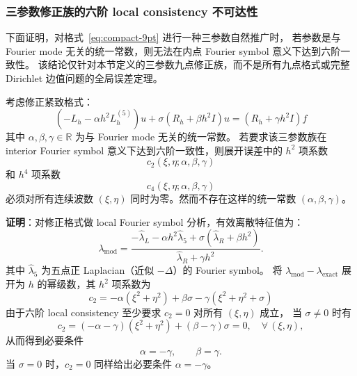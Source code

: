 \subsubsection{三参数修正族的六阶 local consistency 不可达性}

下面证明，对格式~\eqref{eq:compact-9pt} 进行一种三参数自然推广时，
若参数是与 Fourier mode 无关的统一常数，则无法在内点 Fourier symbol 意义下达到六阶一致性。
该结论仅针对本节定义的三参数九点修正族，而不是所有九点格式或完整 Dirichlet 边值问题的全局误差定理。

\begin{theorem}
  \label{thm:6th_impossible}
  考虑修正紧致格式：
  \begin{equation}
    (-L_h - \alpha h^2 L_h^{(5)}) u + \sigma(R_h + \beta h^2 I) u = (R_h + \gamma h^2 I)f
    \label{eq:modified_compact}
  \end{equation}
  其中 $\alpha, \beta, \gamma \in \mathbb{R}$ 为与 Fourier mode 无关的统一常数。
  若要求该三参数族在 interior Fourier symbol 意义下达到六阶一致性，则展开误差中的
  $h^2$ 项系数
  \[
    c_2(\xi,\eta;\alpha,\beta,\gamma)
  \]
  和 $h^4$ 项系数
  \[
    c_4(\xi,\eta;\alpha,\beta,\gamma)
  \]
  必须对所有连续波数 $(\xi,\eta)$ 同时为零。然而不存在这样的统一常数
  $(\alpha,\beta,\gamma)$。

  \textbf{证明}：对修正格式做 local Fourier symbol 分析，有效离散特征值为：
  \begin{equation}
    \lambda_{\mathrm{mod}} = \frac{-\hat{\lambda}_L - \alpha h^2\hat{\lambda}_5
    + \sigma(\hat{\lambda}_R + \beta h^2)}{\hat{\lambda}_R + \gamma h^2}.
  \end{equation}
  其中 $\hat{\lambda}_5$ 为五点正 Laplacian（近似 $-\Delta$）的 Fourier symbol。
  将 $\lambda_{\mathrm{mod}}-\lambda_{\mathrm{exact}}$ 展开为 $h$ 的幂级数，其 $h^2$ 项系数为
  \begin{equation}
    c_2 = -\alpha(\xi^2+\eta^2) + \beta\sigma - \gamma(\xi^2+\eta^2+\sigma)
    \label{eq:c2_general}
  \end{equation}
  由于六阶 local consistency 至少要求 $c_2=0$ 对所有 $(\xi,\eta)$ 成立，
  当 $\sigma\neq 0$ 时有
  \begin{equation}
    c_2 = (-\alpha-\gamma)(\xi^2+\eta^2) + (\beta-\gamma)\sigma = 0, \quad \forall\,(\xi,\eta),
  \end{equation}
  从而得到必要条件
  \begin{equation}
    \alpha=-\gamma,\qquad \beta=\gamma.
    \label{eq:c2_helmholtz_conditions}
  \end{equation}
  当 $\sigma=0$ 时，$c_2=0$ 同样给出必要条件 $\alpha=-\gamma$。


\end{theorem}
